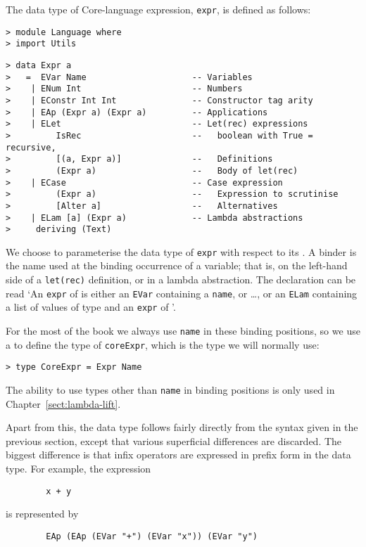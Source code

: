 The data type of Core-language expression, \mbox{\tt expr}, is defined as follows:
\begin{verbatim}
> module Language where
> import Utils
\end{verbatim}
%
%
\begin{verbatim}
> data Expr a
>   =  EVar Name                     -- Variables
>    | ENum Int                      -- Numbers
>    | EConstr Int Int               -- Constructor tag arity
>    | EAp (Expr a) (Expr a)         -- Applications
>    | ELet                          -- Let(rec) expressions
>         IsRec                      --   boolean with True = recursive,
>         [(a, Expr a)]              --   Definitions
>         (Expr a)                   --   Body of let(rec)
>    | ECase                         -- Case expression
>         (Expr a)                   --   Expression to scrutinise
>         [Alter a]                  --   Alternatives
>    | ELam [a] (Expr a)             -- Lambda abstractions
>     deriving (Text)
\end{verbatim}
%
%
%
%
%
%
%
We choose to parameterise the data type of \mbox{\tt expr} with respect to its
.  A binder is the name used at the binding
occurrence of a variable; that is, on the left-hand side of a \mbox{\tt let(rec)}
definition, or in a lambda abstraction.
The declaration
can be read `An \mbox{\tt expr} of \mbox{\tt *} is either an \mbox{\tt EVar} containing a \mbox{\tt name},
or \ldots, or an \mbox{\tt ELam} containing a list of values of
type \mbox{\tt *} and an \mbox{\tt expr} of \mbox{\tt *}'.

For the most of the book we always use \mbox{\tt name} in these binding positions,
so we use a  to define the type of \mbox{\tt coreExpr},
which is the type we will normally use:
\begin{verbatim}
> type CoreExpr = Expr Name
\end{verbatim}
%
The ability to use types other than \mbox{\tt name} in binding positions
is only used in Chapter~\ref{sect:lambda-lift}.

Apart from this, the data type follows fairly directly from the syntax given in
the previous section, except that various superficial differences are
discarded. The biggest difference is that infix operators are expressed in
prefix form in the data type.  For example, the expression
\begin{verbatim}
        x + y
\end{verbatim}
is represented by
\begin{verbatim}
        EAp (EAp (EVar "+") (EVar "x")) (EVar "y")
\end{verbatim}

